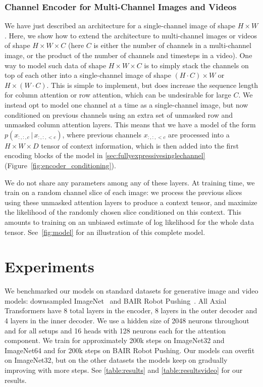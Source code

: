 \documentclass{article} \usepackage{iclr2020_conference,times}
\begin{document}
\subsubsection{Channel Encoder for Multi-Channel Images and Videos}
\label{sec:multichannel}

We have just described an architecture for a single-channel image of shape $H \times W$. Here, we show how to extend the architecture to multi-channel images or videos of shape $H \times W \times C$ (here $C$ is either the number of channels in a multi-channel image, or the product of the number of channels and timesteps in a video).
One way to model such data of shape $H \times W \times C$ is to simply stack the channels on top of each other into a single-channel image of shape $(H \cdot C) \times W$ or $H \times (W \cdot C)$. This is simple to implement, but does increase the sequence length for column attention or row attention, which can be undesirable for large $C$.
We instead opt to model one channel at a time as a single-channel image, but now conditioned on previous channels using an extra set of unmasked row and unmasked column attention layers. This means that we have a model of the form $p(x_{:,:,c} \,|\, x_{:,:,<c})$, where previous channels $x_{:,:,<c}$ are processed into a $H \times W \times D$ tensor of context information, which is then added into the first encoding blocks of the model in \cref{sec:fullyexpressivesinglechannel} (Figure~\ref{fig:encoder_conditioning}).


We do not share any parameters among any of these layers. At training time, we train on a random channel slice of each image: we process the previous slices using these unmasked attention layers to produce a context tensor, and maximize the likelihood of the randomly chosen slice conditioned on this context. This amounts to training on an unbiased estimate of log likelihood for the whole data tensor. See~\cref{fig:model} for an illustration of this complete model.


\FloatBarrier

\section{Experiments}
\label{sec:experiments}

We benchmarked our models on standard datasets for generative image and video models: downsampled ImageNet~\citep{oord2016pixel} and BAIR Robot Pushing~\citep{ebert2017self}. All Axial Transformers have 8 total layers in the encoder, 8 layers in the outer decoder and 4 layers in the inner decoder. We use a hidden size of 2048 neurons throughout and for all setups and 16 heads with 128 neurons each for the attention component. We train for approximately 200k steps on ImageNet32 and ImageNet64 and for 200k steps on BAIR Robot Pushing. Our models can overfit on ImageNet32, but on the other datasets the models keep on gradually improving with more steps. See \cref{table:results} and \cref{table:resultsvideo} for our results.
\end{document}
